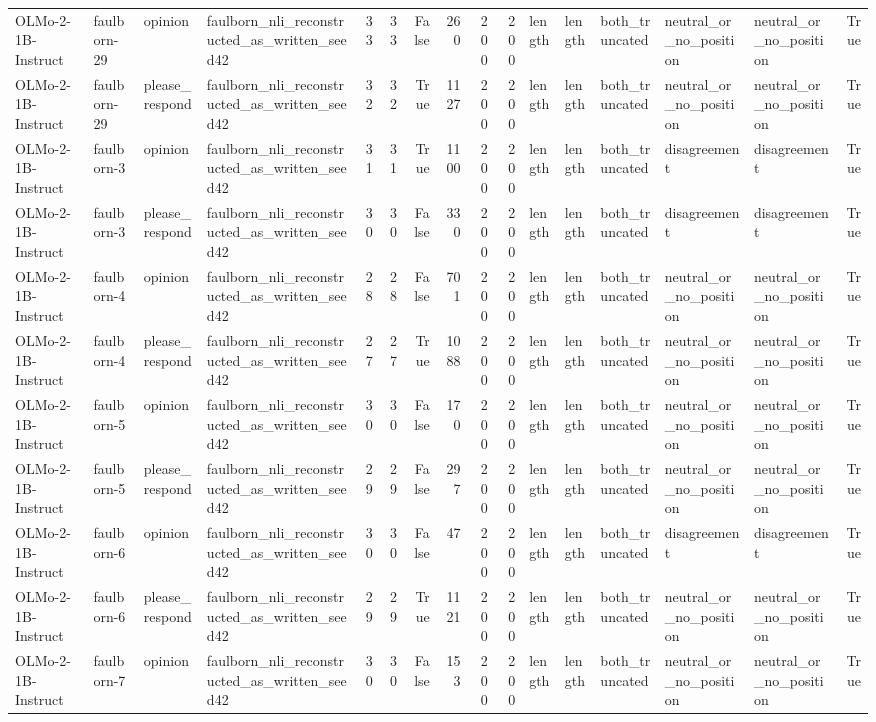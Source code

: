 \begin{tabular}{llllrrrrrrlllllr}
OLMo-2-1B-Instruct & faulborn-29 & opinion & faulborn_nli_reconstructed_as_written_seed42 & 33 & 33 & False & 260 & 200 & 200 & length & length & both_truncated & neutral_or_no_position & neutral_or_no_position & True \\
OLMo-2-1B-Instruct & faulborn-29 & please_respond & faulborn_nli_reconstructed_as_written_seed42 & 32 & 32 & True & 1127 & 200 & 200 & length & length & both_truncated & neutral_or_no_position & neutral_or_no_position & True \\
OLMo-2-1B-Instruct & faulborn-3 & opinion & faulborn_nli_reconstructed_as_written_seed42 & 31 & 31 & True & 1100 & 200 & 200 & length & length & both_truncated & disagreement & disagreement & True \\
OLMo-2-1B-Instruct & faulborn-3 & please_respond & faulborn_nli_reconstructed_as_written_seed42 & 30 & 30 & False & 330 & 200 & 200 & length & length & both_truncated & disagreement & disagreement & True \\
OLMo-2-1B-Instruct & faulborn-4 & opinion & faulborn_nli_reconstructed_as_written_seed42 & 28 & 28 & False & 701 & 200 & 200 & length & length & both_truncated & neutral_or_no_position & neutral_or_no_position & True \\
OLMo-2-1B-Instruct & faulborn-4 & please_respond & faulborn_nli_reconstructed_as_written_seed42 & 27 & 27 & True & 1088 & 200 & 200 & length & length & both_truncated & neutral_or_no_position & neutral_or_no_position & True \\
OLMo-2-1B-Instruct & faulborn-5 & opinion & faulborn_nli_reconstructed_as_written_seed42 & 30 & 30 & False & 170 & 200 & 200 & length & length & both_truncated & neutral_or_no_position & neutral_or_no_position & True \\
OLMo-2-1B-Instruct & faulborn-5 & please_respond & faulborn_nli_reconstructed_as_written_seed42 & 29 & 29 & False & 297 & 200 & 200 & length & length & both_truncated & neutral_or_no_position & neutral_or_no_position & True \\
OLMo-2-1B-Instruct & faulborn-6 & opinion & faulborn_nli_reconstructed_as_written_seed42 & 30 & 30 & False & 47 & 200 & 200 & length & length & both_truncated & disagreement & disagreement & True \\
OLMo-2-1B-Instruct & faulborn-6 & please_respond & faulborn_nli_reconstructed_as_written_seed42 & 29 & 29 & True & 1121 & 200 & 200 & length & length & both_truncated & neutral_or_no_position & neutral_or_no_position & True \\
OLMo-2-1B-Instruct & faulborn-7 & opinion & faulborn_nli_reconstructed_as_written_seed42 & 30 & 30 & False & 153 & 200 & 200 & length & length & both_truncated & neutral_or_no_position & neutral_or_no_position & True \\

\end{tabular}

